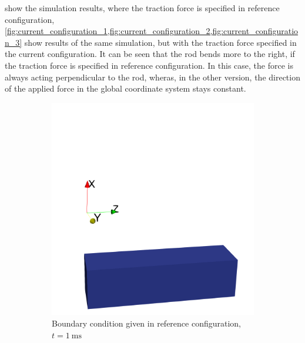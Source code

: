  show the simulation results, where the traction force is specified in reference configuration, \cref{fig:current_configuration_1,fig:current_configuration_2,fig:current_configuration_3} show results of the same simulation, but with the traction force specified in the current configuration.
It can be seen that the rod bends more to the right, if the traction force is specified in reference configuration. In this case, the force is always acting perpendicular to the rod, wheras, in the other version, the direction of the applied force in the global coordinate system stays constant.

\begin{figure}%
  \centering%
  \begin{subfigure}[t]{0.31\textwidth}%
    \centering%
    \includegraphics[width=\textwidth]{images/implementation/current_configuration_1_cropped.png}
    \caption{Boundary condition given in reference configuration, $t=\SI{1}{\milli\second}$}%
    \label{fig:reference_configuration_1}%
  \end{subfigure}
  \quad
  \begin{subfigure}[t]{0.31\textwidth}%
    \centering%

\end{subfigure}
\end{figure}
